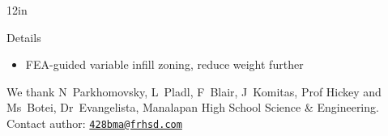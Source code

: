 \documentclass[pdf]{beamer}
\begin{document}
\begin{frame}{}
\begin{columns}[T,totalwidth=\textwidth]
\begin{column}{12in}
\begin{minipage}[t][\textheight]{\linewidth}
\begin{block}{Details}
\begin{itemize}
\begin{itemize}
\item FEA-guided variable infill zoning, reduce weight further
\end{itemize}
\end{itemize}
\end{block}
\vfill
\begin{block}{} %
We thank N~Parkhomovsky, L~Pladl, F~Blair, J~Komitas, Prof Hickey and Ms~Botei, Dr~Evangelista, Manalapan High School Science \& Engineering. Contact author: \href{mailto:428bma@frhsd.com}{\texttt{428bma@frhsd.com}}
\end{block}
\vfill*
\end{minipage}
\end{column}
\end{columns}
\end{frame}
\end{document}
